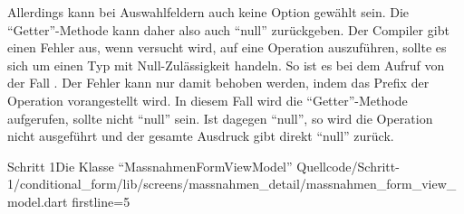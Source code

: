 Allerdings kann bei Auswahlfeldern auch keine Option gewählt sein.
Die \enquote{Getter}-Methode  kann daher also auch \enquote{null} zurückgeben.  
Der Compiler gibt einen Fehler aus, wenn versucht wird, auf  eine Operation auszuführen, sollte es sich um einen Typ mit Null-Zulässigkeit handeln.
So ist es bei dem Aufruf von  der Fall .
Der Fehler kann nur damit behoben werden, indem das Prefix   der Operation vorangestellt wird.
In diesem Fall wird die \enquote{Getter}-Methode  aufgerufen, sollte  nicht \enquote{null} sein.  
Ist  dagegen \enquote{null}, so wird die Operation nicht ausgeführt und der gesamte Ausdruck gibt direkt \enquote{null} zurück.

\begin{alexlisting}{Schritt 1}{Die Klasse \enquote{MassnahmenFormViewModel}}
  {Quellcode/Schritt-1/conditional_form/lib/screens/massnahmen_detail/massnahmen_form_view_model.dart}
  {firstline=5}
  \label{lst:Schritt1KlasseMassnahmenFormViewModel}
\end{alexlisting}